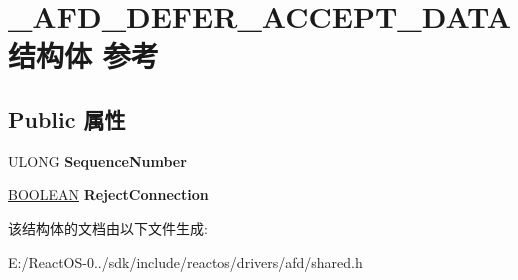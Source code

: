 \hypertarget{struct___a_f_d___d_e_f_e_r___a_c_c_e_p_t___d_a_t_a}{}\section{\+\_\+\+A\+F\+D\+\_\+\+D\+E\+F\+E\+R\+\_\+\+A\+C\+C\+E\+P\+T\+\_\+\+D\+A\+T\+A结构体 参考}
\label{struct___a_f_d___d_e_f_e_r___a_c_c_e_p_t___d_a_t_a}
\subsection*{Public 属性}
\begin{DoxyCompactItemize}
\item 
\mbox{\label{struct___a_f_d___d_e_f_e_r___a_c_c_e_p_t___d_a_t_a_ac27258b4f96b74509620493393a1cfc2}} 
U\+L\+O\+NG {\bfseries Sequence\+Number}
\item 
\mbox{\label{struct___a_f_d___d_e_f_e_r___a_c_c_e_p_t___d_a_t_a_a1de3cd05baf93c58a74db8c2f7075aa6}} 
\hyperlink{_processor_bind_8h_a112e3146cb38b6ee95e64d85842e380a}{B\+O\+O\+L\+E\+AN} {\bfseries Reject\+Connection}
\end{DoxyCompactItemize}


该结构体的文档由以下文件生成\+:\begin{DoxyCompactItemize}
\item 
E\+:/\+React\+O\+S-\/0../sdk/include/reactos/drivers/afd/shared.\+h\end{DoxyCompactItemize}
